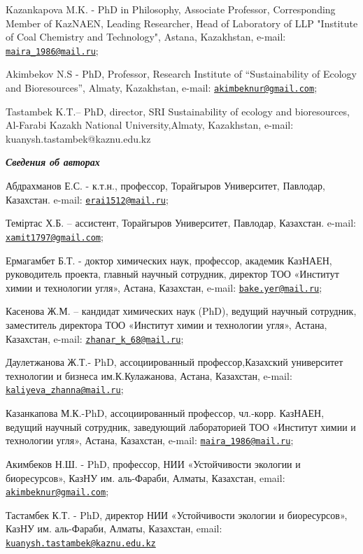 Kazankapova M.K. - PhD in Philosophy, Associate Professor, Corresponding
Member of KazNAEN, Leading Researcher, Head of Laboratory of LLP
"Institute of Coal Chemistry and Technology", Astana, Kazakhstan,
e-mail:
\href{mailto:maira_1986@mail.ru}{\nolinkurl{maira\_1986@mail.ru}};

Akimbekov N.S - PhD, Professor, Research Institute of ``Sustainability
of Ecology and Bioresources'', Almaty, Kazakhstan, e-mail:
\href{mailto:akimbeknur@gmail.com}{\nolinkurl{akimbeknur@gmail.com}};

Tastambek K.T.-- PhD, director, SRI Sustainability of ecology and
bioresources, Al-Farabi Kazakh National University,Almaty, Kazakhstan,
e-mail: kuanysh.tastambek@kaznu.edu.kz

\emph{{\bfseries Сведения об авторах}}

Абдрахманов Е.С. - к.т.н., профессор, Торайгыров Университет, Павлодар,
Казахстан. e-mail:
\href{mailto:erai1512@mail.ru}{\nolinkurl{erai1512@mail.ru}};

Теміртас Х.Б. -- ассистент, Торайгыров Университет, Павлодар, Казахстан.
e-mail:
\href{mailto:xamit1797@gmail.com}{\nolinkurl{xamit1797@gmail.com}};

Ермагамбет Б.Т. - доктор химических наук, профессор, академик КазНАЕН,
руководитель проекта, главный научный сотрудник, директор ТОО «Институт
химии и технологии угля», Астана, Казахстан, e-mail:
\href{mailto:bake.yer@mail.ru}{\nolinkurl{bake.yer@mail.ru}};

Касенова Ж.М. -- кандидат химических наук (PhD), ведущий научный
сотрудник, заместитель директора ТОО «Институт химии и технологии угля»,
Астана, Казахстан, e-mail:
\href{mailto:zhanar_k_68@mail.ru}{\nolinkurl{zhanar\_k\_68@mail.ru}};

Даулетжанова Ж.Т.- PhD, ассоциированный профессор,Казахский университет
технологии и бизнеса им.К.Кулажанова, Астана, Казахстан, e-mail:
\href{mailto:kaliyeva_zhanna@mail.ru}{\nolinkurl{kaliyeva\_zhanna@mail.ru}};

Казанкапова М.К.-PhD, ассоциированный профессор, чл.-корр. КазНАЕН,
ведущий научный сотрудник, заведующий лабораторией ТОО «Институт химии и
технологии угля», Астана, Казахстан, e-mail:
\href{mailto:maira_1986@mail.ru}{\nolinkurl{maira\_1986@mail.ru}};

Акимбеков Н.Ш. - PhD, профессор, НИИ «Устойчивости экологии и
биоресурсов», КазНУ им. аль-Фараби, Алматы, Казахстан, email:
\href{mailto:akimbeknur@gmail.com}{\nolinkurl{akimbeknur@gmail.com}};

Тастамбек К.Т. - PhD, директор НИИ «Устойчивости экологии и
биоресурсов», КазНУ им. аль-Фараби, Алматы, Казахстан, email:
\href{mailto:kuanysh.tastambek@kaznu.edu.kz}{\nolinkurl{kuanysh.tastambek@kaznu.edu.kz}}